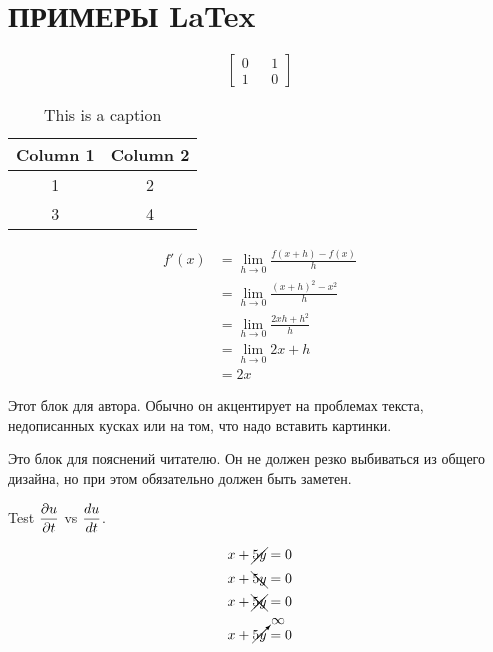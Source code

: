 \chapter*{ПРИМЕРЫ LaTex}

{\color{red}
    \[ \begin{bmatrix}
        0 && 1\\
        1 && 0
    \end{bmatrix}\]

\begin{table}[h]
    \centering
    \begin{tabular}{|c|c|} \hline 
         Column 1& Column 2\\ \hline \hline 
         1& 2\\ \hline 
         3& 4\\ \hline
    \end{tabular}
    \caption{This is a caption}
    \label{tab:my_label}
\end{table}

     \begin{align*}
         f'(x)&=\lim_{h\to 0}\frac{f(x+h)-f(x)}{h}\\
         &= \lim_{h\to 0}\frac{(x+h)^2-x^2}{h}\\
         &= \lim_{h\to 0}\frac{2xh+h^2}{h}\\
         &= \lim_{h\to 0}2x+h\\
         &=2x
     \end{align*}


}

\begin{warn}
Этот блок для автора. Обычно он акцентирует на проблемах текста, недописанных кусках или на том, что надо вставить картинки. 
\end{warn}

\begin{info}
Это блок для пояснений читателю. Он не должен резко выбиваться из общего дизайна, но при этом обязательно должен быть заметен. 
\end{info}



Test $\displaystyle\frac{\partial u}{\partial t}$ vs $\displaystyle\frac{d u}{d t}$.

\[ x+\cancel{5y}=0\]
\[ x+\bcancel{5y}=0\]
\[ x+\xcancel{5y}=0\]
\[ x+\cancelto{\infty}{5y}=0\]
